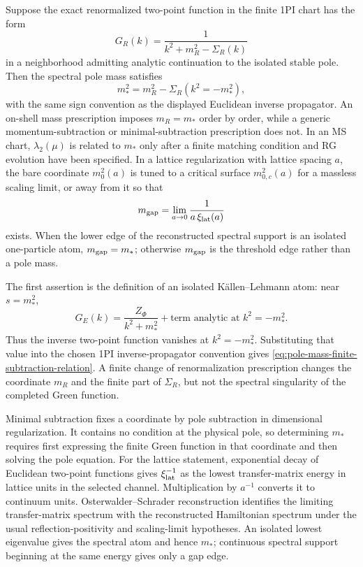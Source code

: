 \begin{remark}
\label{rem:relation-of-mass-notions}
Suppose the exact renormalized two-point function in the finite 1PI chart has
the form
\[
  G_R(k)
  =
  \frac{1}{k^2+m_R^2-\Sigma_R(k)}
\]
in a neighborhood admitting analytic continuation to the isolated stable pole.
Then the spectral pole mass satisfies
\begin{equation}
  m_*^2
  =
  m_R^2-\Sigma_R(k^2=-m_*^2),
  \label{eq:pole-mass-finite-subtraction-relation}
\end{equation}
with the same sign convention as the displayed Euclidean inverse propagator.
An on-shell mass prescription imposes \(m_R=m_*\) order by order, while a
generic momentum-subtraction or minimal-subtraction prescription does not.  In
an MS chart, \(\lambda_2(\mu)\) is related to \(m_*\) only after a finite
matching condition and RG evolution have been specified.  In a lattice
regularization with lattice spacing \(a\), the bare coordinate \(m_0^2(a)\) is
tuned to a critical surface \(m_{0,c}^2(a)\) for a massless scaling limit, or
away from it so that
\begin{equation}
  m_{\rm gap}
  =
  \lim_{a\to0}\frac{1}{a\,\xi_{\rm lat}(a)}
  \label{eq:lattice-gap-scaling-relation}
\end{equation}
exists.  When the lower edge of the reconstructed spectral support is an
isolated one-particle atom, \(m_{\rm gap}=m_*\); otherwise \(m_{\rm gap}\) is
the threshold edge rather than a pole mass.

The first assertion is the definition of an isolated K\"allen--Lehmann atom:
near \(s=m_*^2\),
\[
  G_E(k)=\frac{Z_\Phi}{k^2+m_*^2}+\text{term analytic at }k^2=-m_*^2 .
\]
Thus the inverse two-point function vanishes at \(k^2=-m_*^2\).  Substituting
that value into the chosen 1PI inverse-propagator convention gives
\eqref{eq:pole-mass-finite-subtraction-relation}.  A finite change of
renormalization prescription changes the coordinate \(m_R\) and the finite
part of \(\Sigma_R\), but not the spectral singularity of the completed Green
function.

Minimal subtraction fixes a coordinate by pole subtraction in dimensional
regularization.  It contains no condition at the physical pole, so determining
\(m_*\) requires first expressing the finite Green function in that coordinate
and then solving the pole equation.  For the lattice statement, exponential
decay of Euclidean two-point functions gives \(\xi_{\rm lat}^{-1}\) as the
lowest transfer-matrix energy in lattice units in the selected channel.
Multiplication by \(a^{-1}\) converts it to continuum units.
Osterwalder--Schrader reconstruction identifies the limiting transfer-matrix
spectrum with the reconstructed Hamiltonian spectrum under the usual
reflection-positivity and scaling-limit hypotheses.  An isolated lowest
eigenvalue gives the spectral atom and hence \(m_*\); continuous spectral
support beginning at the same energy gives only a gap edge.
\end{remark}

